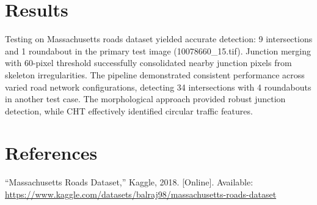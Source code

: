 \documentclass[conference]{IEEEtran}
\begin{document}
\section{Results}

Testing on Massachusetts roads dataset yielded accurate detection: 9 intersections and 1 roundabout in the primary test image (10078660\_15.tif). Junction merging with 60-pixel threshold successfully consolidated nearby junction pixels from skeleton irregularities. The pipeline demonstrated consistent performance across varied road network configurations, detecting 34 intersections with 4 roundabouts in another test case. The morphological approach provided robust junction detection, while CHT effectively identified circular traffic features.

\section*{References}

\begin{thebibliography}{00}
``Massachusetts Roads Dataset,'' Kaggle, 2018. [Online]. Available: \url{https://www.kaggle.com/datasets/balraj98/massachusetts-roads-dataset}
\end{thebibliography}
\end{document}
